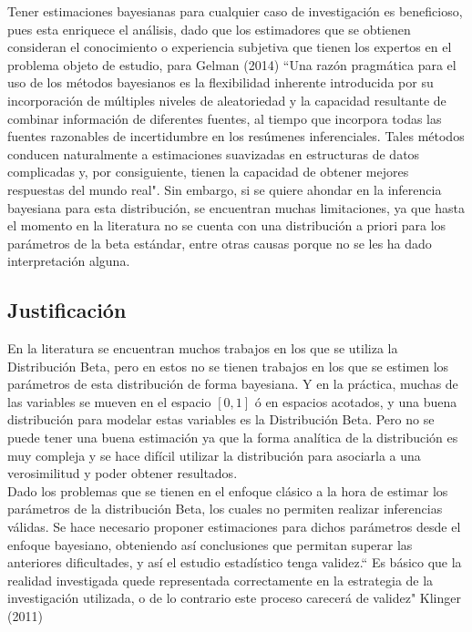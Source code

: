 Tener estimaciones bayesianas para cualquier caso de investigaci\'{o}n es beneficioso, pues esta enriquece el an\'{a}lisis, dado que los estimadores que se obtienen consideran el conocimiento o experiencia subjetiva que tienen los expertos en el problema objeto de estudio, para Gelman (2014) ``Una raz\'{o}n pragm\'{a}tica para el uso de los m\'{e}todos bayesianos es la flexibilidad inherente introducida por su incorporaci\'{o}n de m\'{u}ltiples niveles de aleatoriedad y la capacidad resultante de combinar informaci\'{o}n de diferentes fuentes, al tiempo que incorpora todas las fuentes razonables de incertidumbre en los res\'{u}menes inferenciales. Tales m\'{e}todos conducen naturalmente a estimaciones suavizadas en estructuras de datos complicadas y, por consiguiente, tienen la capacidad de obtener mejores respuestas del mundo real". Sin embargo, si se quiere ahondar en la inferencia bayesiana para esta distribuci\'{o}n, se encuentran muchas limitaciones, ya que hasta el momento en la literatura no se cuenta con una distribuci\'{o}n a priori para los par\'{a}metros de la beta est\'{a}ndar, entre otras causas porque no se les ha dado interpretaci\'{o}n alguna.\\

\subsection{Justificaci\'{o}n}
En la literatura se encuentran muchos trabajos en los que se utiliza la Distribuci\'{o}n Beta, pero en estos no se tienen trabajos en los que se estimen los par\'{a}metros de esta distribuci\'{o}n de forma bayesiana. Y en la pr\'{a}ctica, muchas de las variables se mueven en el espacio $\left[0,1\right] $ \'{o} en espacios acotados, y una buena distribuci\'{o}n para modelar estas variables es la Distribuci\'{o}n Beta. Pero no se puede tener una buena estimaci\'{o}n ya que la forma anal\'{i}tica de la distribuci\'{o}n es muy compleja y se hace dif\'{i}cil utilizar la distribuci\'{o}n para asociarla a una verosimilitud y poder obtener resultados.\\

Dado los problemas que se tienen en el enfoque cl\'{a}sico  a la hora de estimar los par\'{a}metros de la distribuci\'{o}n Beta, los cuales no permiten realizar inferencias v\'{a}lidas. Se hace necesario proponer estimaciones para dichos par\'{a}metros desde el enfoque bayesiano, obteniendo as\'{i} conclusiones que permitan superar las anteriores dificultades, y as\'{i} el estudio estad\'{i}stico tenga validez.`` Es b\'{a}sico que la realidad investigada quede representada correctamente en la estrategia de la investigaci\'{o}n utilizada, o de lo contrario este proceso carecer\'{a} de validez"  Klinger (2011)\\



